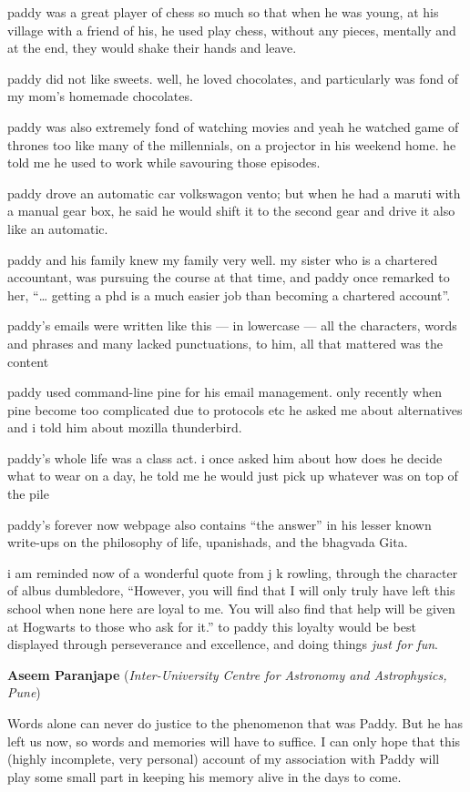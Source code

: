 \documentclass[prd, preprint, longbibliography, 12pt]{revtex4-2}
\begin{document}
paddy was a great player of chess so much so that when he was young, at his village with a friend of his,  he used play chess, without any pieces, mentally and at the end, they would shake their hands and leave.

paddy did not like sweets. well, he loved chocolates, and particularly was fond of my mom’s homemade chocolates.

paddy was also extremely fond of watching movies and yeah he watched game of thrones too like many of the millennials, on a projector in his weekend home. he told me he used to work while savouring those episodes.

paddy drove an automatic car volkswagon vento; but when he had a maruti with a manual gear box, he said he would shift it to the second gear and drive it also like an automatic. 

paddy and his family knew my family very well. my sister who is a chartered accountant, was pursuing the course at that time, and paddy once remarked to her, “… getting a phd is  a much easier job than becoming a chartered account”. 

paddy’s emails were written like this — in lowercase — all the characters, words and phrases and many lacked punctuations, to him, all that mattered was the content

paddy used command-line pine for his email management. only recently when pine become too complicated due to protocols etc he asked me about alternatives and i told him about mozilla thunderbird.

paddy’s whole life was a class act. i once asked him about how does he decide what to wear on a day, he told me he would just pick up whatever was on top of the pile

paddy’s forever now webpage also contains “the answer” in his lesser known write-ups on the philosophy of life, upanishads, and the bhagvada Gita. 

i am reminded now of a wonderful quote from j k rowling, through the character of albus dumbledore, “However, you will find that I will only truly have left this school when none here are loyal to me. You will also find that help will be given at Hogwarts to those who ask for it.”  to paddy this loyalty would be best displayed through perseverance and excellence, and doing things {\it just for fun}. 


\bigskip

\bigskip

\centerline{{\bf Aseem Paranjape} ({\it Inter-University Centre for Astronomy and Astrophysics, Pune})}
\medskip
\noindent Words alone can never do justice to the phenomenon that was Paddy. But he has left us now, so words and memories will have to suffice. I can only hope that this (highly incomplete, very personal) account of my association with Paddy will play some small part in keeping his memory alive in the days to come.
\end{document}
